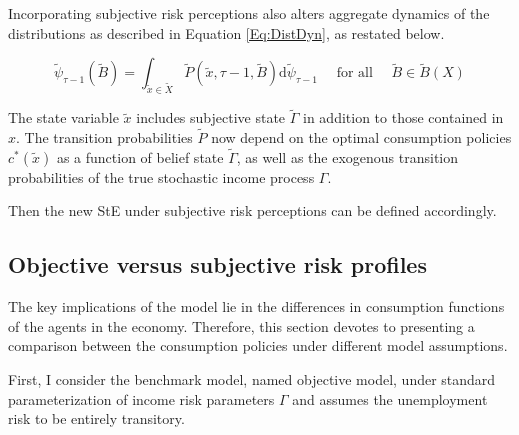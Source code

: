 Incorporating subjective risk perceptions also alters aggregate dynamics of the distributions as described in Equation \ref{Eq:DistDyn}, as restated below. 

\begin{equation}
\label{Eq:DistDynSub}
\tilde \psi_{\tau-1}(\tilde B)=\int_{\tilde x \in \tilde X} \tilde P(\tilde x, \tau-1, \tilde B) \mathrm{d} \tilde \psi_{\tau-1} \quad \text { for all } \quad \tilde B \in \tilde B(X)
\end{equation}

The state variable $\tilde x$ includes subjective state $\tilde \Gamma$ in addition to those contained in $x$. The transition probabilities $\tilde P$ now depend on the optimal consumption policies $c^*(\tilde x)$ as a function of belief state $\tilde \Gamma$, as well as the exogenous transition probabilities of the true stochastic income process $\Gamma$.  

Then the new StE under subjective risk perceptions can be defined accordingly. 

\subsection{Objective versus subjective risk profiles}



The key implications of the model lie in the differences in consumption functions of the agents in the economy. Therefore, this section devotes to presenting a comparison between the consumption policies under different model assumptions. 

First, I consider the benchmark model, named objective model, under standard parameterization of income risk parameters $\Gamma$ and assumes the unemployment risk to be entirely transitory. 

